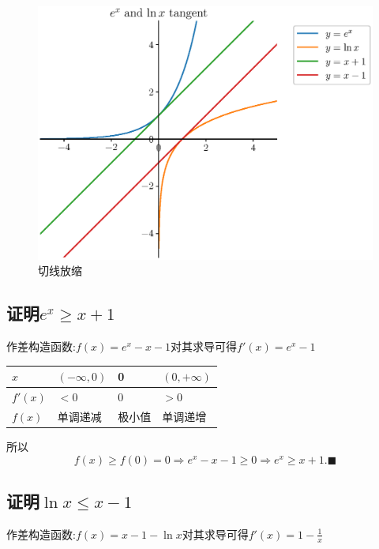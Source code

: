 \documentclass{book}
\begin{document}
    \begin{figure}[htbp]
        \centering
        \includegraphics[width=\textwidth]{img/LogExFunction.eps}
        \caption{切线放缩}
    \end{figure}

    \subsection{证明$e^x\ge x+1$}

    \textcolor[rgb]{0.75,0.17,0.22}{作差构造函数}:$f(x)=e^x-x-1$对其求导可得$f'(x)=e^x-1$

    \begin{table}[htbp]
        \centering
        \begin{tabular}{|l|l|l|l|}
            \hline
            $x$     & $(-\infty,0)$ & 0   & $(0,+\infty)$ \\ \hline
            $f'(x)$ & $<0$          & 0   & $>0$          \\ \hline
            $f(x)$  & 单调递减          & 极小值 & 单调递增          \\ \hline
        \end{tabular}
    \end{table}
    所以$$f(x)\ge f(0)=0\Longrightarrow e^x-x-1\ge 0\Longrightarrow e^x\ge x+1.\blacksquare$$

    \subsection{证明$\ln x\le x-1$}

    \textcolor[rgb]{0.75,0.17,0.22}{作差构造函数}:$f(x)=x-1-\ln x$对其求导可得$\displaystyle f'(x)=1-\frac{1}{x}$
\end{document}
